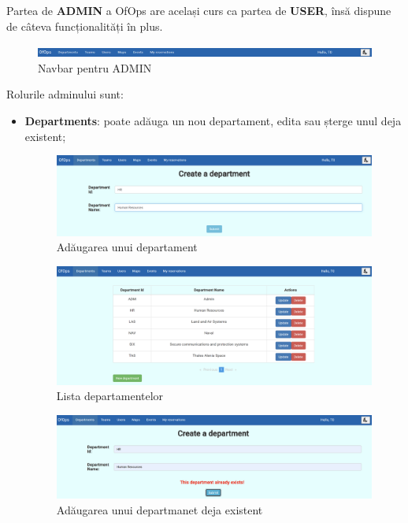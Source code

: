 Partea de \textbf{ADMIN} a OfOps are același curs ca partea de \textbf{USER}, însă dispune de câteva funcționalități în plus. 

\begin{figure}[!htb]
    \centering
    \includegraphics[width=0.9\linewidth]{images/navadm.png}
    \caption{Navbar pentru ADMIN}
    \label{fig:navadm}
\end{figure}

Rolurile adminului sunt:
\begin{itemize}[left=1.5cm]
    \item \textbf{Departments}: poate adăuga un nou departament, edita sau șterge unul deja existent;

    \begin{figure}[!htb]
        \centering
        \includegraphics[width=0.9\linewidth]{images/adaugdep.png}
        \caption{Adăugarea unui departament}
        \label{fig:adaugdep}
    \end{figure}

    \begin{figure}[!htb]
        \centering
        \includegraphics[width=0.9\linewidth]{images/listadep.png}
        \caption{Lista departamentelor}
        \label{fig:listadep}
    \end{figure}

    \begin{figure}[!htb]
        \centering
        \includegraphics[width=0.9\linewidth]{images/exceptiedep.png}
        \caption{Adăugarea unui departmanet deja existent}
        \label{fig:exceptiedep}
    \end{figure}
    

\end{itemize}
